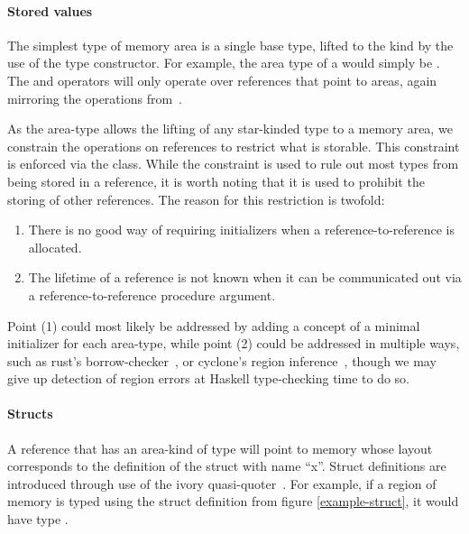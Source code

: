 \paragraph{Stored values}
The simplest type of memory area is a single base type, lifted to the 
kind by the use of the  type constructor.  For example, the area type
of a  would simply be . The  and
 operators will only operate over references that point to  areas,
again mirroring the operations from~\cite{memareas}.

As the  area-type allows the lifting of any star-kinded type to a
memory area, we constrain the operations on references to restrict what is
storable.  This constraint is enforced via the  class.  While the
 constraint is used to rule out most types from being stored in a
reference, it is worth noting that it is used to prohibit the storing of other
references.  The reason for this restriction is twofold:
\begin{enumerate}
\item   There is no good
way of requiring initializers when a reference-to-reference is allocated.
\item The lifetime of a reference is not known when it can be
communicated out via a reference-to-reference procedure argument.
\end{enumerate}

Point (1) could most likely be addressed by adding a concept of a minimal
initializer for each area-type, while point (2) could be addressed in multiple
ways, such as rust's borrow-checker~\cite{rust}, or cyclone's region
inference~\cite{cyclone}, though we may give up detection of region errors at
Haskell type-checking time to do so.

\paragraph{Structs} A reference that has an area-kind of type 
will point to memory whose layout corresponds to the definition of the struct
with name ``x''.  Struct definitions are introduced through use of the ivory
quasi-quoter~\cite{quoted}.  For example, if a region of memory is typed using
the struct definition from figure \ref{example-struct}, it would have type
.

